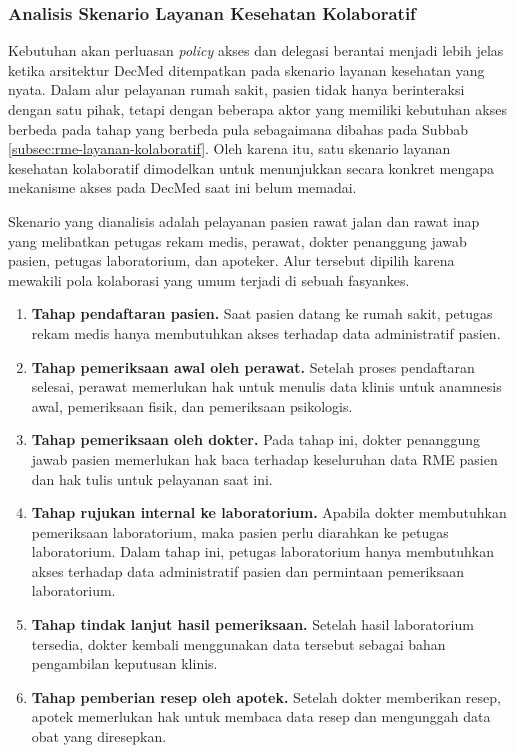 \subsubsection{Analisis Skenario Layanan Kesehatan Kolaboratif}
\label{subsubsec:analisis-skenario-layanan-klinis}
Kebutuhan akan perluasan \textit{policy} akses dan delegasi berantai menjadi lebih jelas ketika arsitektur DecMed ditempatkan pada skenario layanan kesehatan yang nyata. Dalam alur pelayanan rumah sakit, pasien tidak hanya berinteraksi dengan satu pihak, tetapi dengan beberapa aktor yang memiliki kebutuhan akses berbeda pada tahap yang berbeda pula sebagaimana dibahas pada Subbab \ref{subsec:rme-layanan-kolaboratif}. Oleh karena itu, satu skenario layanan kesehatan kolaboratif dimodelkan untuk menunjukkan secara konkret mengapa mekanisme akses pada DecMed saat ini belum memadai.

Skenario yang dianalisis adalah pelayanan pasien rawat jalan dan rawat inap yang melibatkan petugas rekam medis, perawat, dokter penanggung jawab pasien, petugas laboratorium, dan apoteker. Alur tersebut dipilih karena mewakili pola kolaborasi yang umum terjadi di sebuah fasyankes.

\begin{enumerate}[]
	\item \textbf{Tahap pendaftaran pasien.} Saat pasien datang ke rumah sakit, petugas rekam medis hanya membutuhkan akses terhadap data administratif pasien.
	\item \textbf{Tahap pemeriksaan awal oleh perawat.} Setelah proses pendaftaran selesai, perawat memerlukan hak untuk menulis data klinis untuk anamnesis awal, pemeriksaan fisik, dan pemeriksaan psikologis.
	\item \textbf{Tahap pemeriksaan oleh dokter.} Pada tahap ini, dokter penanggung jawab pasien memerlukan hak baca terhadap keseluruhan data RME pasien dan hak tulis untuk pelayanan saat ini.
	\item \textbf{Tahap rujukan internal ke laboratorium.} Apabila dokter membutuhkan pemeriksaan laboratorium, maka pasien perlu diarahkan ke petugas laboratorium. Dalam tahap ini, petugas laboratorium hanya membutuhkan akses terhadap data administratif pasien dan permintaan pemeriksaan laboratorium.
	\item \textbf{Tahap tindak lanjut hasil pemeriksaan.} Setelah hasil laboratorium tersedia, dokter kembali menggunakan data tersebut sebagai bahan pengambilan keputusan klinis.
	\item \textbf{Tahap pemberian resep oleh apotek.} Setelah dokter memberikan resep, apotek memerlukan hak untuk membaca data resep dan mengunggah data obat yang diresepkan.
\end{enumerate}

